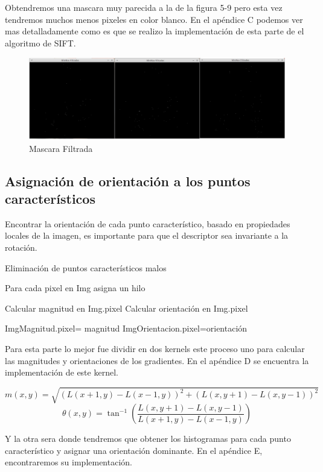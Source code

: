 Obtendremos una mascara muy parecida a la de la figura 5-9 pero esta vez tendremos muchos menos pixeles en color blanco. En el apéndice C podemos ver mas detalladamente como es que se realizo la implementación de esta parte de el algoritmo de SIFT.

\begin{figure}[h]
			\centering
				\includegraphics[scale=0.3]{img/minmax.jpg}
			\caption{Mascara Filtrada}
\end{figure}



\subsection{Asignación de orientación a los puntos característicos}

Encontrar la orientación de cada punto característico, basado en propiedades locales de la imagen, es importante para que el descriptor sea invariante a la rotación.


\begin{algorithm}[H]
\caption{Eliminación de puntos característicos malos}
 Para cada pixel en Img asigna un hilo\;
 
 {
	Calcular magnitud en Img.pixel\;
	Calcular orientación en Img.pixel\;
	
	ImgMagnitud.pixel= magnitud\;
	ImgOrientacion.pixel=orientación\;
	
}
\end{algorithm}



Para esta parte lo mejor fue dividir en dos kernels este proceso uno para calcular las magnitudes y orientaciones de los gradientes. En el apéndice D se encuentra la implementación de este kernel.

$$m(x,y) = \sqrt{ (L(x+1,y)-L(x-1,y))^2 + (L(x,y+1)-L(x,y-1))^2 }$$		
$$\theta(x,y) =  \tan^{-1} \left(\frac{L(x,y+1)-L(x,y-1)}{L(x+1,y)-L(x-1,y)}\right)$$


Y la otra sera donde tendremos que obtener los histogramas para cada punto característico y asignar una orientación dominante. En el apéndice E, encontraremos su implementación. 


